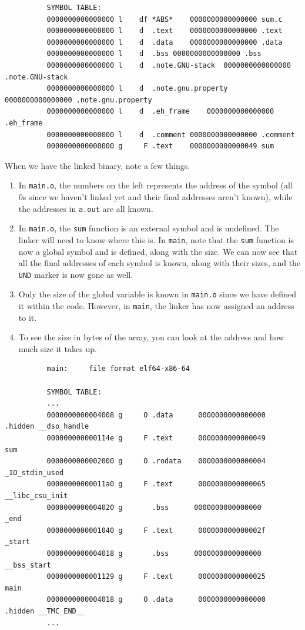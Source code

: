 \documentclass{article}
\begin{document}
\begin{example}
\begin{lstlisting}
          SYMBOL TABLE:
          0000000000000000 l    df *ABS*	0000000000000000 sum.c
          0000000000000000 l    d  .text	0000000000000000 .text
          0000000000000000 l    d  .data	0000000000000000 .data
          0000000000000000 l    d  .bss	0000000000000000 .bss
          0000000000000000 l    d  .note.GNU-stack	0000000000000000 .note.GNU-stack
          0000000000000000 l    d  .note.gnu.property	0000000000000000 .note.gnu.property
          0000000000000000 l    d  .eh_frame	0000000000000000 .eh_frame
          0000000000000000 l    d  .comment	0000000000000000 .comment
          0000000000000000 g     F .text	0000000000000049 sum
        \end{lstlisting}
        When we have the linked binary, note a few things. 
        \begin{enumerate}
          \item In \texttt{main.o}, the numbers on the left represents the address of the symbol (all 0s since we haven't linked yet and their final addresses aren't known), while the addresses in \texttt{a.out} are all known. 
          \item In \texttt{main.o}, the \texttt{sum} function is an external symbol and is undefined. The linker will need to know where this is. In \texttt{main}, note that the \texttt{sum} function is now a global symbol and is defined, along with the size. We can now see that all the final addresses of each symbol is known, along with their sizes, and the \texttt{UND} marker is now gone as well. 
          \item Only the size of the global variable is known in \texttt{main.o} since we have defined it within the code. However, in \texttt{main}, the linker has now assigned an address to it.
          \item To see the size in bytes of the array, you can look at the address and how much size it takes up. 
        \end{enumerate}
        \begin{lstlisting}
          main:     file format elf64-x86-64

          SYMBOL TABLE:
          ...
          0000000000004008 g     O .data	  0000000000000000              .hidden __dso_handle
          000000000000114e g     F .text	  0000000000000049              sum
          0000000000002000 g     O .rodata	  0000000000000004              _IO_stdin_used
          00000000000011a0 g     F .text	  0000000000000065              __libc_csu_init
          0000000000004020 g       .bss	     0000000000000000              _end
          0000000000001040 g     F .text	  000000000000002f              _start
          0000000000004018 g       .bss	     0000000000000000              __bss_start
          0000000000001129 g     F .text	  0000000000000025              main
          0000000000004018 g     O .data	  0000000000000000              .hidden __TMC_END__
          ...
        \end{lstlisting}
      \end{example}
\end{document}

